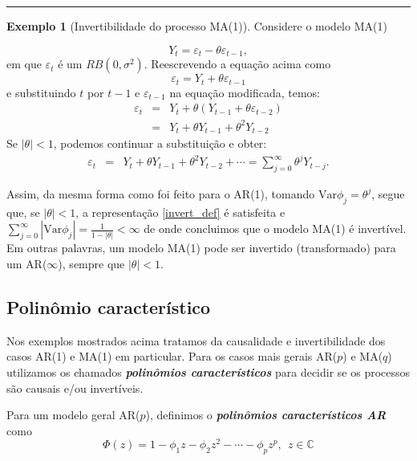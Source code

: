 \documentclass[
]{book}
\theoremstyle{definition}
\theoremstyle{definition}
\newtheorem{example}{Exemplo}[chapter]
\theoremstyle{definition}
\theoremstyle{remark}
\begin{document}
\begin{center}\rule{0.5\linewidth}{0.5pt}\end{center}

\begin{example}[Invertibilidade do processo MA(1)]
\protect\hypertarget{exm:invma1}{}{\label{exm:invma1} {} }Considere o modelo MA(1)

\[
Y_t = \varepsilon_t -\theta \varepsilon_{t-1},
\]
em que \(\varepsilon_t\) é um \(RB(0,\sigma^2)\). Reescrevendo a equação acima
como
\[
\varepsilon_t = Y_t + \theta \varepsilon_{t-1}
\]
e substituindo \(t\) por \(t - 1\)
e \(\varepsilon_{t-1}\) na equação modificada, temos:
\begin{eqnarray*}
\varepsilon_t &=& Y_t + \theta(Y_{t-1} + \theta \varepsilon_{t-2})\\
    &=& Y_t + \theta Y_{t-1} + \theta^2Y_{t-2}
\end{eqnarray*}
Se \(|\theta| < 1\), podemos continuar a substituição e obter:
\begin{eqnarray*}
  \varepsilon_t  &=& Y_t + \theta Y_{t-1} + \theta^2Y_{t-2}+\cdots = \sum_{j=0}^\infty\theta^jY_{t-j}.
\end{eqnarray*}

Assim, da mesma forma como foi feito para o AR(1), tomando \(\mbox{Var}\phi_j=\theta^j\), segue que, se \(|\theta| < 1\), a representação \eqref{invert_def} é satisfeita e \(\sum_{j=0}^\infty|\mbox{Var}\phi_j|=\frac1{1-|\theta|}<\infty\) de onde concluimos que o modelo MA(1) é invertível. Em outras palavras, um modelo MA(1) pode ser invertido (transformado) para um AR(\(\infty\)), sempre que \(|\theta|<1\).
\end{example}

\hypertarget{polinuxf4mio-caracteruxedstico}{%
\subsection{Polinômio característico}\label{polinuxf4mio-caracteruxedstico}}

Nos exemplos mostrados acima tratamos da causalidade e invertibilidade dos casos
AR(1) e MA(1) em particular. Para os casos mais gerais AR(\(p\)) e MA(\(q\)) utilizamos os
chamados \textbf{\emph{polinômios característicos}} para decidir se os processos são causais e/ou invertíveis.

Para um modelo geral AR(\(p\)), definimos o \textbf{\emph{polinômios característicos AR}}
como
\[
\Phi(z) = 1 - \phi_1 z -\phi_2 z^2-\cdots-\phi_p z^p, \ \ z\in\mathbb{C}
\]
\end{document}
